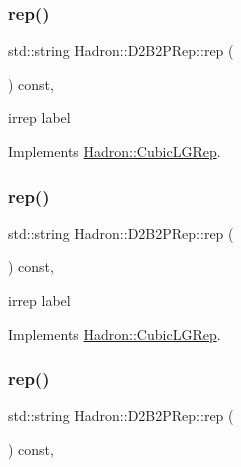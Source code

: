 \subsubsection{\texorpdfstring{rep()}{rep()}\hspace{0.1cm}{\footnotesize\ttfamily [1/3]}}
{\footnotesize\ttfamily std\+::string Hadron\+::\+D2\+B2\+P\+Rep\+::rep (\begin{DoxyParamCaption}{ }\end{DoxyParamCaption}) const\hspace{0.3cm}{\ttfamily [inline]}, {\ttfamily [virtual]}}

irrep label 

Implements \mbox{\hyperlink{structHadron_1_1CubicLGRep_a50f5ddbb8f4be4cee0106fa9e8c75e6c}{Hadron\+::\+Cubic\+L\+G\+Rep}}.

\mbox{\label{structHadron_1_1D2B2PRep_a5def410cb7d63545ef2a907e86c16bf3}} 
\subsubsection{\texorpdfstring{rep()}{rep()}\hspace{0.1cm}{\footnotesize\ttfamily [2/3]}}
{\footnotesize\ttfamily std\+::string Hadron\+::\+D2\+B2\+P\+Rep\+::rep (\begin{DoxyParamCaption}{ }\end{DoxyParamCaption}) const\hspace{0.3cm}{\ttfamily [inline]}, {\ttfamily [virtual]}}

irrep label 

Implements \mbox{\hyperlink{structHadron_1_1CubicLGRep_a50f5ddbb8f4be4cee0106fa9e8c75e6c}{Hadron\+::\+Cubic\+L\+G\+Rep}}.

\mbox{\label{structHadron_1_1D2B2PRep_a5def410cb7d63545ef2a907e86c16bf3}} 
\subsubsection{\texorpdfstring{rep()}{rep()}\hspace{0.1cm}{\footnotesize\ttfamily [3/3]}}
{\footnotesize\ttfamily std\+::string Hadron\+::\+D2\+B2\+P\+Rep\+::rep (\begin{DoxyParamCaption}{ }\end{DoxyParamCaption}) const\hspace{0.3cm}{\ttfamily [inline]}, {\ttfamily [virtual]}}

